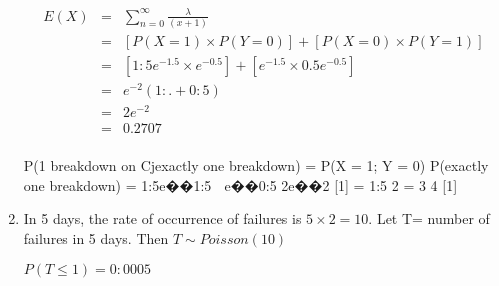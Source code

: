 \documentclass[a4paper,12pt]{article}
\begin{document}
\begin{enumerate}
\begin{eqnarray*}
E(X)  &=&  \sum^{\infty}_{n=0}  \frac{\lambda}{(x + 1)}\\
&=&  [P(X = 1) \times P(Y = 0)] + [P(X = 0) \times P(Y = 1)] \\
&=& [1:5e^{-1.5} \times e^{-0.5}] + [e^{-1.5} \times 0.5e^{-0.5}]\\
&=& e^{-2}(1:. + 0:5)\\
&=& 2e^{-2}\\
&=& 0.2707\\

\end{eqnarray*}


P(1 breakdown on Cjexactly one breakdown) =
P(X = 1; Y = 0)
P(exactly one breakdown)
=
1:5e��1:5  e��0:5
2e��2 [1]
=
1:5
2
=
3
4
[1]

\item In 5 days, the rate of occurrence of failures is $5\times 2 = 10$. Let T=
number of failures in 5 days. Then
$T \sim Poisson(10)$

$P(T \leq 1) = 0:0005 $
\end{enumerate}
\end{document}
